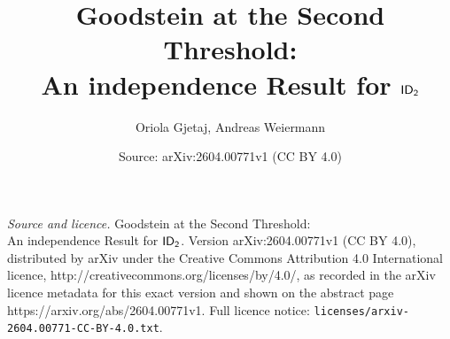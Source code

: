 \documentclass[10pt,a4paper]{amsart}
\title{\texorpdfstring{Goodstein at the Second Threshold:\\ An independence Result for $\sf ID_2$}{Goodstein at the Second Threshold: An Independence Result for ID2}}
\author{Oriola Gjetaj, Andreas Weiermann}
\date{Source: arXiv:2604.00771v1 (CC BY 4.0)}
\begin{document}
\maketitle

\noindent\emph{Source and licence.} \texorpdfstring{Goodstein at the Second Threshold:\\ An independence Result for $\sf ID_2$}{Goodstein at the Second Threshold: An Independence Result for ID2}. Version arXiv:2604.00771v1 (CC BY 4.0), distributed by arXiv under the Creative Commons Attribution 4.0 International licence, http://creativecommons.org/licenses/by/4.0/, as recorded in the arXiv licence metadata for this exact version and shown on the abstract page https://arxiv.org/abs/2604.00771v1. Full licence notice: \texttt{licenses/arxiv-2604.00771-CC-BY-4.0.txt}.\par\smallskip
\end{document}
